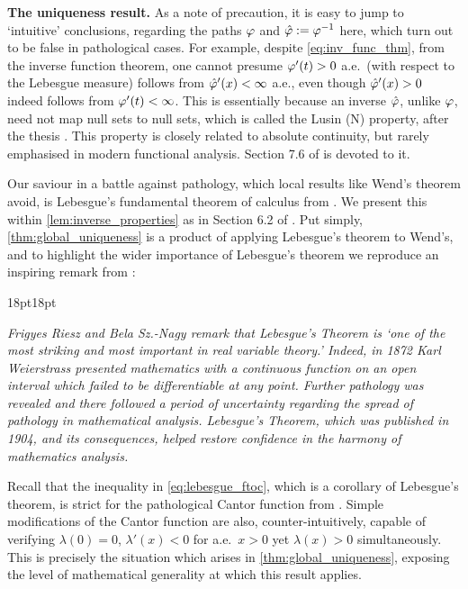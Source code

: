 \vspace{3mm}\textbf{The uniqueness result.} As a note of precaution, it is easy to jump to `intuitive' conclusions, regarding the paths $\varphi$ and $\hat{\varphi}:=\varphi^{-1}$ here, which turn out to be false in pathological cases. For example, despite \autoref{eq:inv_func_thm}, from the inverse function theorem, one cannot presume $\varphi'(t)>0$ a.e.~(with respect to the Lebesgue measure) follows from $\hat{\varphi}'(x)<\infty$ a.e., even though $\hat{\varphi}'(x)>0$ indeed follows from $\varphi'(t)<\infty$. This is essentially because an inverse $\hat{\varphi}$, unlike $\varphi$, need not map null sets to null sets, which is called the Lusin (N) property, after the thesis \cite{lusin_1916}. This property is closely related to absolute continuity, but rarely emphasised in modern functional analysis. Section 7.6 of \cite{saks_1937} is devoted to it.

Our saviour in a battle against pathology, which local results like Wend's theorem avoid, is Lebesgue's fundamental theorem of calculus from \cite{lebesgue_1904}. We present this within \autoref{lem:inverse_properties} as in Section 6.2 of \cite{royden_2010}. Put simply, \autoref{thm:global_uniqueness} is a product of applying Lebesgue's theorem to Wend's, and to highlight the wider importance of Lebesgue's theorem we reproduce an inspiring remark from \cite{royden_2010}:

\vspace{-6mm}
\begin{adjustwidth}{18pt}{18pt}
\begin{remark}\label{rem:pathology}
    \emph{Frigyes Riesz and Bela Sz.-Nagy remark that Lebesgue's Theorem is `one of the most striking and most important in real variable theory.' Indeed, in 1872 Karl Weierstrass presented mathematics with a continuous function on an open interval which failed to be differentiable at any point. Further pathology was revealed and there followed a period of uncertainty regarding the spread of pathology in mathematical analysis. Lebesgue's Theorem, which was published in 1904, and its consequences, helped restore confidence in the harmony of mathematics analysis.}
\end{remark}
\end{adjustwidth}

\vspace{2mm}Recall that the inequality in \autoref{eq:lebesgue_ftoc}, which is a corollary of Lebesgue's theorem, is strict for the pathological Cantor function from \cite{cantor_1884}. Simple modifications of the Cantor function are also, counter-intuitively, capable of verifying $\lambda(0)=0$, $\lambda'(x)<0$ for a.e.~$x>0$ yet $\lambda(x)>0$ simultaneously. This is precisely the situation which arises in \autoref{thm:global_uniqueness}, exposing the level of mathematical generality at which this result applies.


